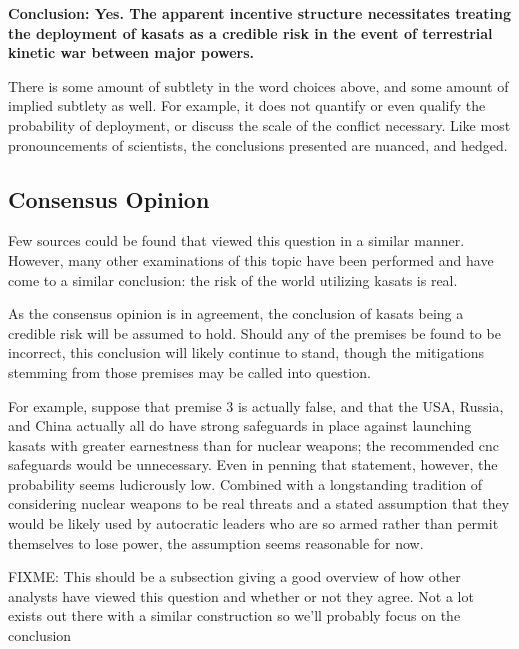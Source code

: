 \begin{blockquote}
  {\bf Conclusion: Yes.  The apparent incentive structure necessitates
    treating the deployment of \acp{kasat} as a credible risk in the
    event of terrestrial kinetic war between major powers.}
\end{blockquote}

There is some amount of subtlety in the word choices above, and some
amount of implied subtlety as well.  For example, it does not quantify
or even qualify the probability of deployment, or discuss the scale of
the conflict necessary.  Like most pronouncements of scientists, the
conclusions presented are nuanced, and hedged.

\subsection{Consensus Opinion}

Few sources could be found that viewed this question in a similar
manner.  However, many other examinations of this topic have been
performed and have come to a similar conclusion: the risk of the world
utilizing \acp{kasat} is real.

As the consensus opinion is in agreement, the conclusion of
\acp{kasat} being a credible risk will be assumed to hold.  Should any
of the premises be found to be incorrect, this conclusion will likely
continue to stand, though the mitigations stemming from those premises
may be called into question.

For example, suppose that premise 3 is actually false, and that the
USA, Russia, and China actually all do have strong safeguards in place
against launching \acp{kasat} with greater earnestness than for
nuclear weapons; the recommended \ac{cnc} safeguards would be
unnecessary.  Even in penning that statement, however, the probability
seems ludicrously low.  Combined with a longstanding tradition of
considering nuclear weapons to be real threats and a stated assumption
that they would be likely used by autocratic leaders who are so armed
rather than permit themselves to lose power\cite[that colonel]{xxx},
the assumption seems reasonable for now.

FIXME: This should be a subsection giving a good overview of how other
analysts have viewed this question and whether or not they agree.  Not
a lot exists out there with a similar construction so we'll probably
focus on the conclusion

